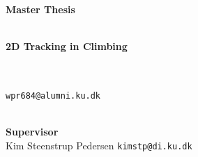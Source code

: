 \documentclass[11pt, a4paper]{article}
\begin{document}
\thispagestyle{empty}

\vspace*{2 cm}
\noindent \textbf{\huge Master Thesis} \\
\vspace*{1 cm} \\

\begin{center}
    \noindent \textbf{\Huge 2D Tracking in Climbing} \\
    \vspace*{0.5 cm}
     \\
\end{center}

\vspace{0.5 cm}

\begin{center}
     \\
    \noindent \texttt{\large wpr684@alumni.ku.dk} \\
    \vspace{0.5 cm}
     \\
    \vspace{2 cm}
\end{center}

\vspace{10 cm}
\noindent \textbf{\large Supervisor} \\
\noindent Kim Steenstrup Pedersen \texttt{kimstp@di.ku.dk}

\clearpage
\ClearWallPaper


\clearpage


\clearpage


\clearpage

\tableofcontents
\clearpage


\clearpage


\clearpage
\end{document}
